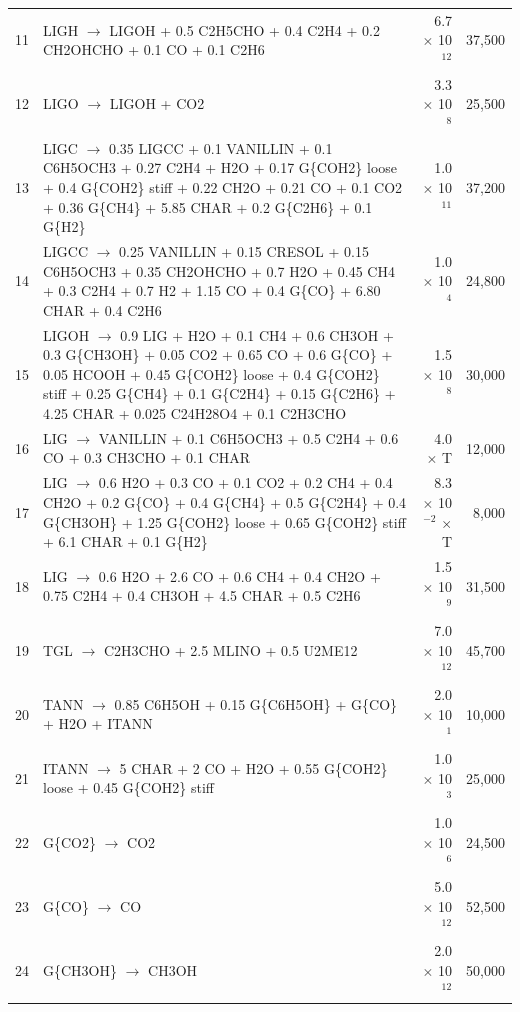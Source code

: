 \documentclass[12pt,titlepage]{article}
\begin{document}
\begin{center}
\begin{longtable}{cp{4in}rr}
    11 & LIGH $\rightarrow$ LIGOH + 0.5 C2H5CHO + 0.4 C2H4 + 0.2 CH2OHCHO + 0.1 CO + 0.1 C2H6 & 6.7 $\times$ 10$^{12}$ & 37,500 \\
    12 & LIGO $\rightarrow$ LIGOH + CO2 & 3.3 $\times$ 10$^8$ & 25,500 \\
    13 & LIGC $\rightarrow$ 0.35 LIGCC + 0.1 VANILLIN + 0.1 C6H5OCH3 + 0.27 C2H4 + H2O + 0.17 G\{COH2\} loose + 0.4 G\{COH2\} stiff + 0.22 CH2O + 0.21 CO + 0.1 CO2 + 0.36 G\{CH4\} + 5.85 CHAR + 0.2 G\{C2H6\} + 0.1 G\{H2\} & 1.0 $\times$ 10$^{11}$ & 37,200 \\
    14 & LIGCC $\rightarrow$ 0.25 VANILLIN + 0.15 CRESOL + 0.15 C6H5OCH3 + 0.35 CH2OHCHO + 0.7 H2O + 0.45 CH4 + 0.3 C2H4 + 0.7 H2 + 1.15 CO + 0.4 G\{CO\} + 6.80 CHAR + 0.4 C2H6 & 1.0 $\times$ 10$^4$ & 24,800 \\
    15 & LIGOH $\rightarrow$ 0.9 LIG + H2O + 0.1 CH4 + 0.6 CH3OH + 0.3 G\{CH3OH\} + 0.05 CO2 + 0.65 CO + 0.6 G\{CO\} + 0.05 HCOOH + 0.45 G\{COH2\} loose + 0.4 G\{COH2\} stiff + 0.25 G\{CH4\} + 0.1 G\{C2H4\} + 0.15 G\{C2H6\} + 4.25 CHAR + 0.025 C24H28O4 + 0.1 C2H3CHO & 1.5 $\times$ 10$^8$ & 30,000 \\
    16 & LIG $\rightarrow$ VANILLIN + 0.1 C6H5OCH3 + 0.5 C2H4 + 0.6 CO + 0.3 CH3CHO + 0.1 CHAR & 4.0 $\times$ T & 12,000 \\
    17 & LIG $\rightarrow$ 0.6 H2O + 0.3 CO + 0.1 CO2 + 0.2 CH4 + 0.4 CH2O + 0.2 G\{CO\} + 0.4 G\{CH4\} + 0.5 G\{C2H4\} + 0.4 G\{CH3OH\} + 1.25 G\{COH2\} loose + 0.65 G\{COH2\} stiff + 6.1 CHAR + 0.1 G\{H2\} & 8.3 $\times$ 10$^{-2}$ $\times$ T & 8,000 \\
    18 & LIG $\rightarrow$ 0.6 H2O + 2.6 CO + 0.6 CH4 + 0.4 CH2O + 0.75 C2H4 + 0.4 CH3OH + 4.5 CHAR + 0.5 C2H6 & 1.5 $\times$ 10$^9$ & 31,500 \\
    19 & TGL $\rightarrow$ C2H3CHO + 2.5 MLINO + 0.5 U2ME12 & 7.0 $\times$ 10$^{12}$ & 45,700 \\
    20 & TANN $\rightarrow$ 0.85 C6H5OH + 0.15 G\{C6H5OH\} + G\{CO\} + H2O + ITANN & 2.0 $\times$ 10$^1$ & 10,000 \\
    21 & ITANN $\rightarrow$ 5 CHAR + 2 CO + H2O + 0.55 G\{COH2\} loose + 0.45 G\{COH2\} stiff & 1.0 $\times$ 10$^3$ & 25,000 \\
    22 & G\{CO2\} $\rightarrow$ CO2 & 1.0 $\times$ 10$^6$ & 24,500 \\
    23 & G\{CO\} $\rightarrow$ CO & 5.0 $\times$ 10$^{12}$ & 52,500 \\
    24 & G\{CH3OH\} $\rightarrow$ CH3OH & 2.0 $\times$ 10$^{12}$ & 50,000 \\

\end{longtable}
\end{center}
\end{document}
